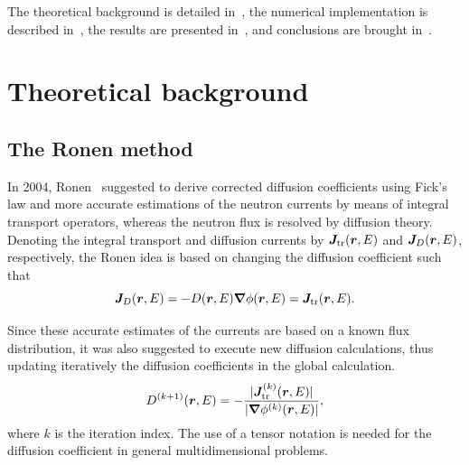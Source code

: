 
The theoretical background is detailed in~, the numerical implementation is described in~, the results are presented in~, and conclusions are brought in~.

%
\section{Theoretical background}
\label{sec:theory}

%
\subsection{The Ronen method}
\label{sec:RM}

In 2004, Ronen~\cite{Ronen-2004} suggested to derive corrected diffusion coefficients using Fick's law and more accurate estimations of the neutron currents by means of integral transport operators, whereas the neutron flux is resolved by diffusion theory. Denoting the integral transport and diffusion currents by $\bm{J}_{\textrm{\scriptsize{tr}}}(\bm{r},E)$ and $\bm{J}_D(\bm{r},E)$, respectively, the Ronen idea is based on changing the diffusion coefficient such that
\begin{equation}\label{eq:Fick}
\bm{J}_D(\bm{r},E) = -D(\bm{r},E)\bm{\nabla}\phi(\bm{r},E) = \bm{J}_{\textrm{\scriptsize{tr}}}(\bm{r},E). 
\end{equation}

Since these accurate estimates of the currents are based on a known flux distribution, it was also suggested to execute new diffusion calculations, thus updating iteratively the diffusion coefficients in the global calculation. 
\begin{equation}\label{eq:RM-it}
D^{(k+1)}(\bm{r},E) = -\frac{\lvert\bm{J}_{\textrm{\scriptsize{tr}}}^{(k)}(\bm{r},E)\rvert}{\lvert\bm{\nabla}\phi^{(k)}(\bm{r},E)\rvert} ,
\end{equation}
where $k$ is the iteration index. The use of a tensor notation is needed for the diffusion coefficient in general multidimensional problems.

